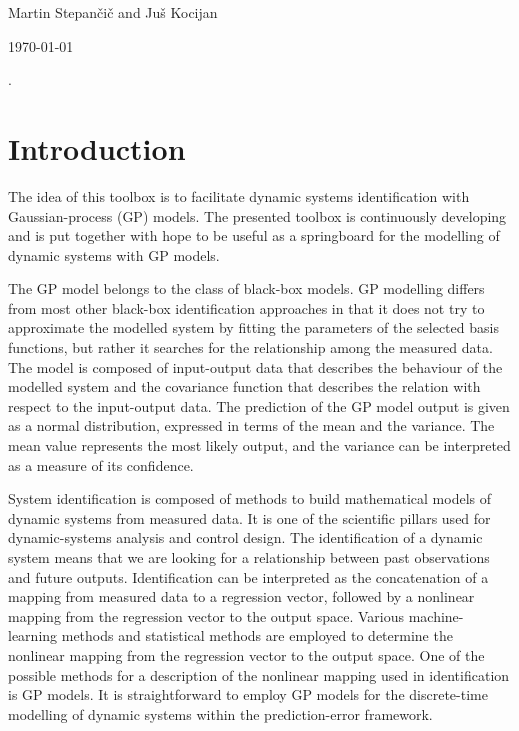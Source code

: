 \documentclass[12pt,twoside]{article}
\begin{document}
\thispagestyle{empty}
\vspace{3cm}

\vspace{4cm}

 \vspace{3mm}
\vspace{3cm}
\begin{center}{\Large Martin Stepan\v ci\v c and Ju\v s Kocijan} \end{center}

  \vfill \centerline{\Large \today}
\pagebreak\setcounter{page}{1}
\newpage


\newpage
\thispagestyle{empty} .\newpage {}
\setcounter{page}{1}

\section{Introduction}

The idea of this toolbox is to facilitate dynamic systems
identification with Gaussian-process (GP) models. The presented toolbox is continuously developing and is put together with hope to be useful
as a springboard for the modelling of dynamic systems with GP models.

The GP model belongs to the class of black-box models. GP modelling
differs from most other black-box identification approaches in that it does
not try to approximate the modelled system by fitting the parameters of the
selected basis functions, but rather it searches for the relationship among the measured data. The model is composed of input-output data that describes
the behaviour of the modelled system and the covariance function that describes the relation with respect to the input-output data. The prediction of
the GP model output is given as a normal distribution, expressed in terms
of the mean and the variance. The mean value represents the most likely
output, and the variance can be interpreted as a measure of its confidence.

System identification is composed of methods to build mathematical models of dynamic systems from measured data. It is one of the scientific pillars used for dynamic-systems analysis and control design. The identification of a dynamic system means that we are looking for a relationship between past observations and future outputs. Identification can be interpreted as the concatenation of a mapping from measured data to a regression vector, followed by a nonlinear mapping from the regression vector to the output space. Various machine-learning methods and statistical methods are employed to determine the nonlinear mapping from the regression vector
to the output space. One of the possible methods for a description of the nonlinear mapping used in identification is GP models. It is straightforward to employ GP models for the discrete-time modelling of dynamic systems within the prediction-error framework.
\end{document}
